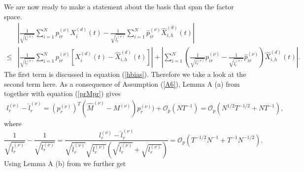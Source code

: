 We are now ready to make a statement about the basis that span the factor space. %
\begin{equation}\label{gamphi}
\begin{split}
&\left|\frac{1}{\sqrt{l_r^{(\nu)}}}\sum_{i=1}^N p^{(\nu)}_{ir} X_i^{(d)}(t)-\frac{1}{\sqrt{\hat{l}_r^{(\nu)}}}\sum_{i=1}^N \hat{p}^{(\nu)}_{ir}\hat{X}^{(d)}_{i,h}(t)\right|\\
 \leq &\left|\frac{1}{\sqrt{l_r^{(\nu)}}}\sum_{i=1}^N p^{(\nu)}_{ir} \left[X_i^{(d)}(t)-\hat{X}^{(d)}_{i,h}(t)\right]\right| +  \left|\sum_{i=1}^N \left( \frac{1}{\sqrt{l_r^{(\nu)}}} p^{(\nu)}_{ir} - \frac{1}{\sqrt{\hat{l}_r^{(\nu)}}} \hat{p}^{(\nu)}_{ir} \right) \hat{X}^{(d)}_{i,h}(t)\right|.
\end{split}
\end{equation}
The first term is discussed in equation (\ref{hbias}). Therefore we take a look at the second term here. %
As a consequence of Assumption (\ref{A6}), Lemma A (a) from \cite{Kneip2001} together with equation (\ref{prMpr}) gives
\begin{equation}
\label{lambdabias}
\begin{split}
l^{(\nu)}_r-\hat{l}_r^{(\nu)} = (p^{(\nu)}_r)^T (\hat{M}^{(\nu)}-M^{(\nu)})p^{(\nu)}_r) +\mathcal{O}_p(NT^{-1})= \mathcal{O}_p(N^{1/2}T^{-1/2} + NT^{-1}),
\end{split}
\end{equation}
where 
\begin{equation} \label{lrsqrt}
\frac{1}{\sqrt{\hat{l}^{(\nu)}_r}}-\frac{1}{\sqrt{l^{(\nu)}_r}}=\frac{l^{(\nu)}_r-\hat{l}^{(\nu)}_r}{\sqrt{\hat{l}^{(\nu)}_r}\sqrt{l^{(\nu)}_r}(\sqrt{\hat{l}^{(\nu)}_r}+\sqrt{l^{(\nu)}_r})}= \mathcal{O}_p\left(T^{-1/2}N^{-1}+T^{-1}N^{-1/2}\right).
\end{equation}%
Using Lemma A (b) from \cite{Kneip2001} we further get
